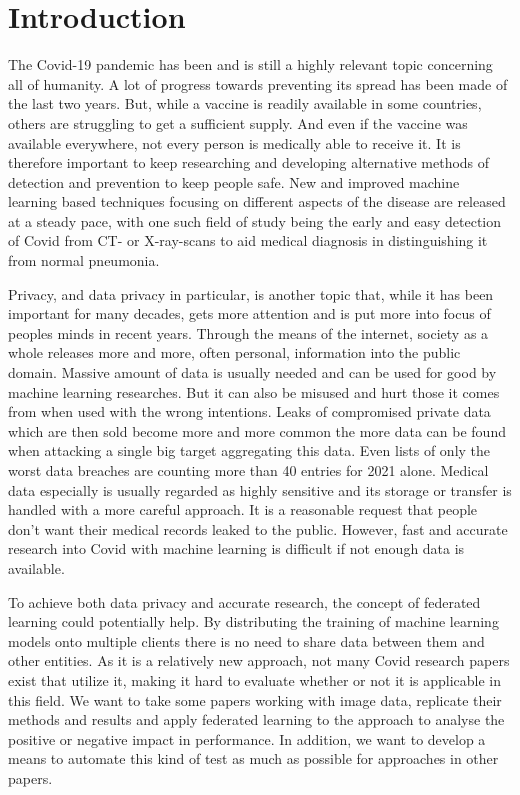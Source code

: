 \section{Introduction}

The Covid-19 pandemic has been and is still a highly relevant topic concerning all of humanity. A lot of progress towards preventing its spread has been made of the last two years. But, while a vaccine is readily available in some countries, others are struggling to get a sufficient supply. And even if the vaccine was available everywhere, not every person is medically able to receive it. It is therefore important to keep researching and developing alternative methods of detection and prevention to keep people safe. New and improved machine learning based techniques focusing on different aspects of the disease are released at a steady pace, with one such field of study being the early and easy detection of Covid from CT- or X-ray-scans to aid medical diagnosis in distinguishing it from normal pneumonia.

Privacy, and data privacy in particular, is another topic that, while it has been important for many decades, gets more attention and is put more into focus of peoples minds in recent years. Through the means of the internet, society as a whole releases more and more, often personal, information into the public domain. Massive amount of data is usually needed and can be used for good by machine learning researches. But it can also be misused and hurt those it comes from when used with the wrong intentions. Leaks of compromised private data which are then sold become more and more common the more data can be found when attacking a single big target aggregating this data. Even lists of only the worst data breaches are counting more than 40 entries for 2021 alone.\cite{data_breaches}
Medical data especially is usually regarded as highly sensitive and its storage or transfer is handled with a more careful approach. It is a reasonable request that people don't want their medical records leaked to the public. However, fast and accurate research into Covid with machine learning is difficult if not enough data is available. 

To achieve both data privacy and accurate research, the concept of federated learning could potentially help. By distributing the training of machine learning models onto multiple clients there is no need to share data between them and other entities. As it is a relatively new approach, not many Covid research papers exist that utilize it, making it hard to evaluate whether or not it is applicable in this field. We want to take some papers working with image data, replicate their methods and results and apply federated learning to the approach to analyse the positive or negative impact in performance. In addition, we want to develop a means to automate this kind of test as much as possible for approaches in other papers. 

